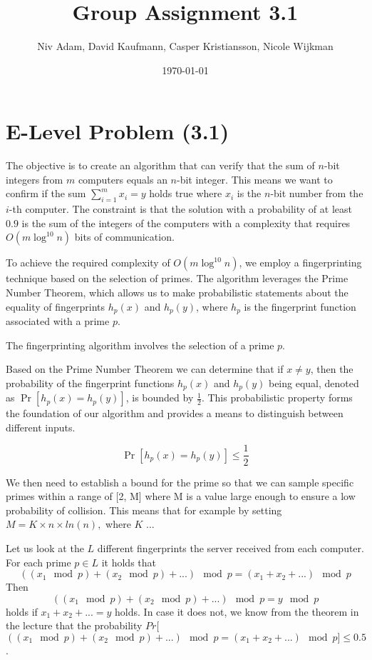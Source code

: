 \documentclass{article}
\title{Group Assignment 3.1}
\author{Niv Adam, David Kaufmann, Casper Kristiansson, Nicole Wijkman}
\date{\today}
\begin{document}
\maketitle

\setlength\parindent{0pt}   %
\setlength{\parskip}{\bigskipamount}    %

\section{E-Level Problem (3.1)}
The objective is to create an algorithm that can verify that the sum of \(n\)-bit integers from \(m\) computers equals an \(n\)-bit integer. This means we want to confirm if the sum \(\sum_{i=1}^{m} x_i = y\) holds true where \(x_i\) is the \(n\)-bit number from the \(i\)-th computer. The constraint is that the solution with a probability of at least \(0.9\) is the sum of the integers of the computers with a complexity that requires \(O(m\log^{10}n)\) bits of communication.

To achieve the required complexity of \(O(m\log^{10}n)\), we employ a fingerprinting technique based on the selection of primes. The algorithm leverages the Prime Number Theorem, which allows us to make probabilistic statements about the equality of fingerprints \(h_p(x)\) and \(h_p(y)\), where \(h_p\) is the fingerprint function associated with a prime \(p\).

The fingerprinting algorithm involves the selection of a prime \(p\). 

Based on the Prime Number Theorem we can determine that if \(x \neq y\), then the probability of the fingerprint functions \(h_p(x)\) and \(h_p(y)\) being equal, denoted as \(\Pr[h_p(x) = h_p(y)]\), is bounded by \(\frac{1}{2}\). This probabilistic property forms the foundation of our algorithm and provides a means to distinguish between different inputs.

\[
\Pr[h_p(x) = h_p(y)] \leq \frac{1}{2}
\]

We then need to establish a bound for the prime so that we can sample specific primes within a range of [2, M] where M is a value large enough to ensure a low probability of collision. This means that for example by setting \(M = K \times n \times ln(n),\) where \(K\) ... %


Let us look at the $L$ different fingerprints the server received from each computer. For each prime $p\in L$ it holds that
$$((x_1 \mod p)+(x_2 \mod p) + ...)\mod p = (x_1 + x_2 + ...)\mod p$$
Then 
$$((x_1 \mod p)+(x_2 \mod p) + ...)\mod p = y\mod p$$
holds if $x_1+x_2+...=y$ holds. In case it does not, we know from the theorem in the lecture that the probability $Pr[$$((x_1 \mod p)+(x_2 \mod p) + ...)\mod p = (x_1 + x_2 + ...)\mod p]\leq 0.5$.

% 
% 
\end{document}
